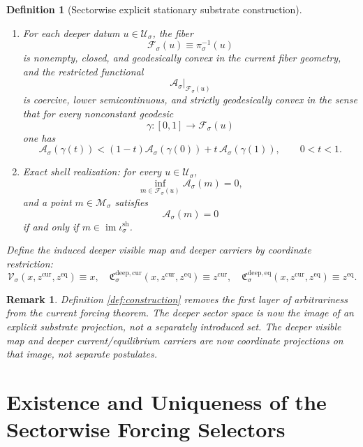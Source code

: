 \documentclass[11pt]{article}
\newcommand{\SubSpace}[1]{\mathcal M_{#1}}
\newcommand{\DataProj}[1]{\pi_{#1}}
\newcommand{\Fiber}[1]{\mathcal F_{#1}}
\newcommand{\ShellEmbed}[1]{\iota_{#1}^{\mathrm{sh}}}
\newcommand{\StationaryFunctional}[1]{\mathscr A_{#1}}
\newcommand{\DeepSpace}[1]{\mathcal U_{#1}}
\newcommand{\VisibleMap}[1]{\mathcal V_{#1}}
\newcommand{\DeepCurrentCarrier}[1]{\mathfrak C_{#1}^{\mathrm{deep,cur}}}
\newcommand{\DeepEqCarrier}[1]{\mathfrak C_{#1}^{\mathrm{deep,eq}}}
\newtheorem{definition}{Definition}
\newtheorem{remark}{Remark}
\begin{document}
\begin{definition}[Sectorwise explicit stationary substrate construction]
\begin{enumerate}
\[    \]
    which is \(C^{1}\) along the fibers of \(\DataProj{\sigma}\).
    \item For each deeper datum \(u\in\DeepSpace{\sigma}\), the fiber
    \[
    \Fiber{\sigma}(u)
    \equiv
    \DataProj{\sigma}^{-1}(u)
    \]
    is nonempty, closed, and geodesically convex in the current fiber geometry, and the restricted functional
    \[
    \StationaryFunctional{\sigma}\big|_{\Fiber{\sigma}(u)}
    \]
    is coercive, lower semicontinuous, and strictly geodesically convex in the sense that for every nonconstant geodesic
    \[
    \gamma:[0,1]\to \Fiber{\sigma}(u)
    \]
    one has
    \begin{equation}
    \StationaryFunctional{\sigma}(\gamma(t))
    <
    (1-t)\StationaryFunctional{\sigma}(\gamma(0))
    +
    t\,\StationaryFunctional{\sigma}(\gamma(1)),
    \qquad
    0<t<1.
    \label{eq:strictconvex}
    \end{equation}
    \item Exact shell realization: for every \(u\in\DeepSpace{\sigma}\),
    \begin{equation}
    \inf_{m\in\Fiber{\sigma}(u)}
    \StationaryFunctional{\sigma}(m)
    =0,
    \label{eq:zeroinf}
    \end{equation}
    and a point \(m\in\SubSpace{\sigma}\) satisfies
    \[
    \StationaryFunctional{\sigma}(m)=0
    \]
    if and only if \(m\in\operatorname{im}\ShellEmbed{\sigma}\).
\end{enumerate}
Define the induced deeper visible map and deeper carriers by coordinate restriction:
\begin{equation}
\VisibleMap{\sigma}(x,z^{\mathrm{cur}},z^{\mathrm{eq}})\equiv x,
\quad
\DeepCurrentCarrier{\sigma}(x,z^{\mathrm{cur}},z^{\mathrm{eq}})
\equiv z^{\mathrm{cur}},
\quad
\DeepEqCarrier{\sigma}(x,z^{\mathrm{cur}},z^{\mathrm{eq}})
\equiv z^{\mathrm{eq}}.
\label{eq:deepcoords}
\end{equation}
\end{definition}

\begin{remark}
Definition \ref{def:construction} removes the first layer of arbitrariness from the current forcing theorem. The deeper sector space is now the image of an explicit substrate projection, not a separately introduced set. The deeper visible map and deeper current/equilibrium carriers are now coordinate projections on that image, not separate postulates.
\end{remark}

\section{Existence and Uniqueness of the Sectorwise Forcing Selectors}
\end{document}
